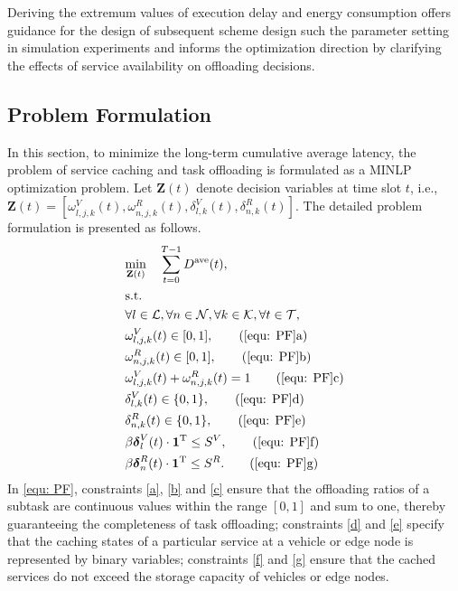 \documentclass[lettersize,journal]{IEEEtran}
\begin{document}
Deriving the extremum values of execution delay and energy consumption offers guidance for the design of subsequent scheme design such the parameter setting in simulation experiments and informs the  optimization direction by clarifying the effects of service availability on offloading decisions. 





\subsection{Problem Formulation} 
In this section, to minimize the long-term cumulative average latency, the problem of service caching and task offloading is formulated as a MINLP optimization problem. Let $ \mathbf{Z}(t) $ denote decision variables at time slot  $ t $, i.e., $  \mathbf{Z}(t) = [ \omega^{V}_{l,j,k}(t), \omega^{R}_{n,j,k}(t), \delta^{V}_{l,k}(t),\delta^{R}_{n,k}(t)] $.  
The detailed problem formulation is presented as follows.
\begin{align}
		&\underset{\mathbf{Z}(t)}{\min} \quad \sum_{t=0}^{T-1} D^{\text{ave}}(t),
		\label{equ: PF}
		\\
		& \text{s.t.} \notag
		\\
		& \forall l\in \mathcal{L}, \forall n\in \mathcal{N}, \forall k\in \mathcal{K}, \forall t\in \mathcal{T}, \notag
		\\
		& \omega^{V}_{l,j,k}(t)\in [0,1], 
		\tag{\ref{equ: PF}a}
		\label{a} 
		\\
		&\omega^{R}_{n,j,k}(t)\in [0,1], 
		\tag{\ref{equ: PF}b}
		\label{b} 
		\\
		&\omega^{V}_{l,j,k}(t) + \omega^{R}_{n,j,k}(t)=1
		\tag{\ref{equ: PF}c}
		\label{c} 
		\\
		&\delta^{V}_{l,k}(t)\in \{0,1\}, 
		\tag{\ref{equ: PF}d}
		\label{d} 
		\\
		&\delta^{R}_{n,k}(t)\in \{0,1\}, 
		\tag{\ref{equ: PF}e}
		\label{e} 
		\\
		&\beta \boldsymbol{\delta}^{V}_{l}(t) \cdot \mathbf{1}^{\mathrm{T}}  \le S^{V}, 
		\tag{\ref{equ: PF}f}
		\label{f} 
		\\
		&\beta \boldsymbol{\delta}^{R}_{n}(t) \cdot \mathbf{1}^{\mathrm{T}}  \le S^{R}.
		\tag{\ref{equ: PF}g}
		\label{g} 
\end{align}
In \eqref{equ: PF}, 
constraints \eqref{a}, \eqref{b} and \eqref{c} ensure that the offloading ratios of a subtask are continuous values within the range $ [0,1] $ and sum to one, thereby guaranteeing the completeness of task offloading;  
constraints \eqref{d} and \eqref{e} specify that the caching states of a particular service at a vehicle or edge node is represented by binary variables;  
constraints \eqref{f} and \eqref{g} ensure that the cached services do not exceed the storage capacity of vehicles or edge nodes.
\end{document}
